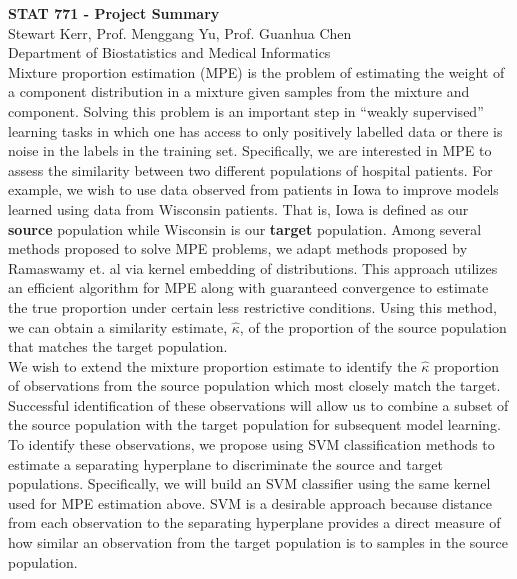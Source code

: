 \documentclass[12pt,preprint]{report}
\begin{document}
%

\def\spacingset#1{\renewcommand{\baselinestretch}%
{#1}\small\normalsize} \spacingset{1}



\spacingset{1.25} %
 
\textbf{STAT 771 - Project Summary} \\
Stewart Kerr,  Prof. Menggang Yu,  Prof. Guanhua Chen \\
Department of Biostatistics and Medical Informatics \\

Mixture proportion estimation (MPE) is the problem of estimating the weight of a component distribution in a mixture given samples from the mixture and component. Solving this problem is an important step in “weakly supervised” learning tasks in which one has access to only positively labelled data or there is noise in the labels in the training set. Specifically, we are interested in MPE to assess the similarity between two different populations of hospital patients. For example, we wish to use data observed from patients in Iowa to improve models learned using data from Wisconsin patients. That is, Iowa is defined as our \textbf{source} population while Wisconsin is our \textbf{target} population. Among several methods proposed to solve MPE problems, we adapt methods proposed by Ramaswamy et. al via kernel embedding of distributions. This approach utilizes an efficient algorithm for MPE along with guaranteed convergence to estimate the true proportion under certain less restrictive conditions. Using this method, we can obtain a similarity estimate, $\hat{\kappa}$, of the proportion of the source population that matches the target population. \\

We wish to extend the mixture proportion estimate to identify the $\hat{\kappa}$ proportion of observations from the source population which most closely match the target. Successful identification of these observations will allow us to combine a subset of the source population with the target population for subsequent model learning.  To identify these observations, we propose using SVM classification methods to estimate a separating hyperplane to discriminate the source and target populations. Specifically, we will build an SVM classifier using the same kernel used for MPE estimation above. SVM is a desirable approach because distance from each observation to the separating hyperplane provides a direct measure of how similar an observation from the target population is to samples in the source population. \\
\end{document}
